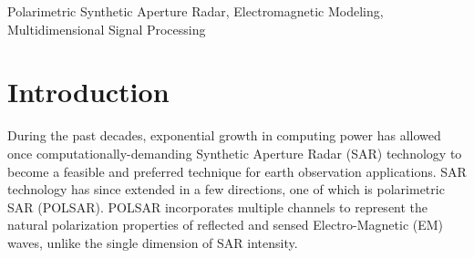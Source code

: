 \documentclass[journal]{IEEEtran}
\begin{document}
\begin{abstract}
\end{abstract}

\begin{IEEEkeywords}
Polarimetric Synthetic Aperture Radar, Electromagnetic Modeling, Multidimensional Signal Processing  
\end{IEEEkeywords}

\IEEEpeerreviewmaketitle

\section{Introduction}

During the past decades, exponential growth in computing power has allowed once computationally-demanding Synthetic Aperture Radar (SAR)
technology to become a feasible and preferred technique for earth observation applications.
SAR technology has since extended in a few directions, one of which is polarimetric SAR (POLSAR).
POLSAR incorporates multiple channels to represent the natural polarization properties of reflected and sensed Electro-Magnetic (EM) waves, unlike the single dimension of SAR intensity.
\end{document}
